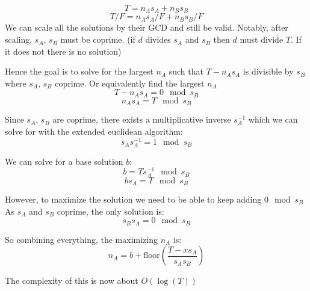 \documentclass{article}
\begin{document}
\[
T = n_A s_A + n_B s_B
\]
\[
T/F = n_A s_A/F + n_B s_B/F
\]
We can scale all the solutions by their GCD and still be valid.
Notably, after scaling, $s_A$, $s_B$ must be coprime.
(if $d$ divides $s_A$ and $s_B$ then $d$ must divide $T$. If it does not there is no solution)

Hence the goal is to solve for the largest $n_A$ such that $T-n_A s_A$ is divisible by $s_B$ where $s_A$, $s_B$ coprime.
Or equivalently find the largest $n_A$
\[
T - n_A s_A  = 0 \mod s_B
\]
\[
n_A s_A  = T \mod s_B
\]

Since $s_A$, $s_B$ are coprime, there exists a multiplicative inverse $s_A^{-1}$
which we can solve for with the extended euclidean algorithm:
\[
  s_A s_A^{-1} = 1 \mod s_B
\]

We can solve for a base solution $b$:
\[
  b = T s_A^{-1} \mod s_B
\]
\[
  b s_A  = T \mod s_B
\]

However, to maximize the solution we need to be able to keep adding $0 \mod s_B$
As $s_A$ and $s_B$ coprime, the only solution is:
\[
  s_B s_A  = 0 \mod s_B
\]

So combining everything, the maximizing $n_A$ is:
\[
n_A = b + \text{floor}(\frac{T - x s_A}{s_A s_B})
\]

The complexity of this is now about $O(\log(T))$
\end{document}
